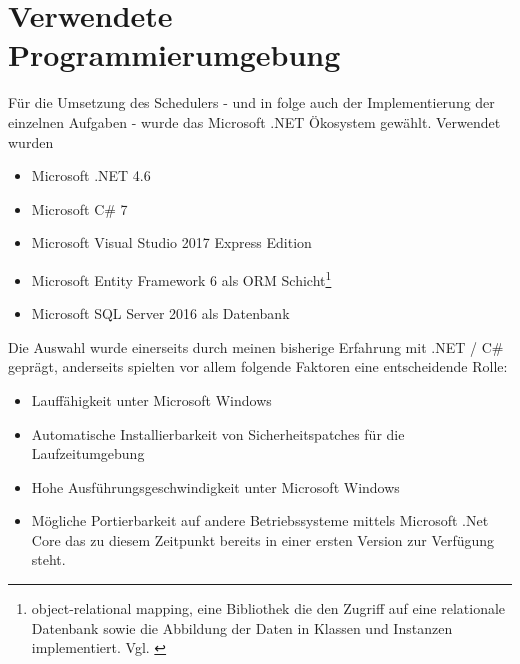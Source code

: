 \section{Verwendete Programmierumgebung}
Für die Umsetzung des Schedulers - und in folge auch der Implementierung der einzelnen Aufgaben - wurde das Microsoft .NET Ökosystem gewählt. Verwendet wurden
\begin{itemize}
	\item Microsoft .NET 4.6
	\item Microsoft C\# 7
	\item Microsoft Visual Studio 2017 Express Edition
	\item Microsoft Entity Framework 6 als ORM Schicht\footnote{object-relational mapping, eine Bibliothek die den Zugriff auf eine relationale Datenbank sowie die Abbildung der Daten in Klassen und Instanzen implementiert. Vgl. \cite{ef_orm} }
	\item Microsoft SQL Server 2016 als Datenbank
\end{itemize}
Die Auswahl wurde einerseits durch meinen bisherige Erfahrung mit .NET / C\# geprägt, anderseits spielten vor allem folgende Faktoren eine entscheidende Rolle:
\begin{itemize}
	\item Lauffähigkeit unter Microsoft Windows
	\item Automatische Installierbarkeit von Sicherheitspatches für die Laufzeitumgebung
	\item Hohe Ausführungsgeschwindigkeit unter Microsoft Windows
	\item Mögliche Portierbarkeit auf andere Betriebssysteme mittels Microsoft .Net Core das zu diesem Zeitpunkt bereits in einer ersten Version zur Verfügung steht.
\end{itemize}
\chapterend
